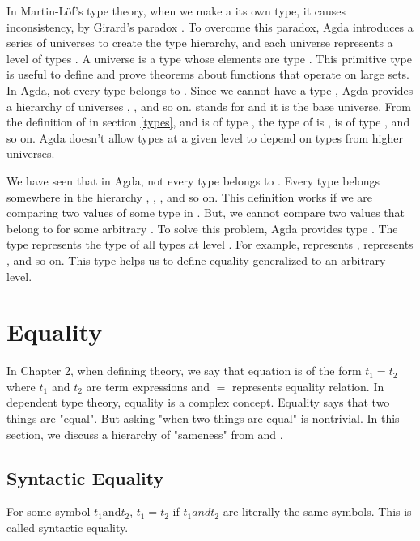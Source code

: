 In Martin-Löf's type theory, when we make a  its own type, it causes
inconsistency, by Girard's paradox \cite{coquand1986analysis}. To overcome this
paradox, Agda introduces a series of universes to create the type hierarchy, and
each universe represents a level of types \cite{sortSystem}. A universe is a
type whose elements are type \cite{universeagda}. This primitive type is useful
to define and prove theorems about functions that operate on large sets. In Agda,
not every type belongs to . Since we cannot have a type , Agda provides a hierarchy of universes , ,
 and so on.  stands for  and it is the
base universe. From the definition of  in section \ref{types},
 and  is of type , the type of
 is ,  is of type , and so on.
Agda doesn't allow types at a given level to depend on types from higher
universes.  

We have seen that in Agda, not every type belongs to . Every
type belongs somewhere in the hierarchy , ,
, and so on. This definition works if we are comparing two values
of some type in . But, we cannot compare two values that belong to
 for some arbitrary . To solve this problem, Agda
provides type . The type  represents the type of all
types at level . For example,  represents ,
 represents , and so on. This type helps us to define
equality generalized to an arbitrary level.

\section{Equality}
\label{equality}
In Chapter 2, when defining theory, we say that equation is of the form $t_1 =
t_2$ where $t_1$ and $t_2$ are term expressions and $=$ represents equality
relation. In dependent type theory, equality is a complex concept. Equality says
that two things are "equal". But asking "when two things are equal" is
nontrivial. In this section, we discuss a hierarchy of "sameness" from
\cite{bocquet2020coherence} and \cite{eremondi2022propositional}.

\subsection{Syntactic Equality}
For some symbol $t_1 \text{and} t_2$, $t_1 = t_2$ if $t_1 and t_2$ are literally
the same symbols. This is called syntactic equality.

